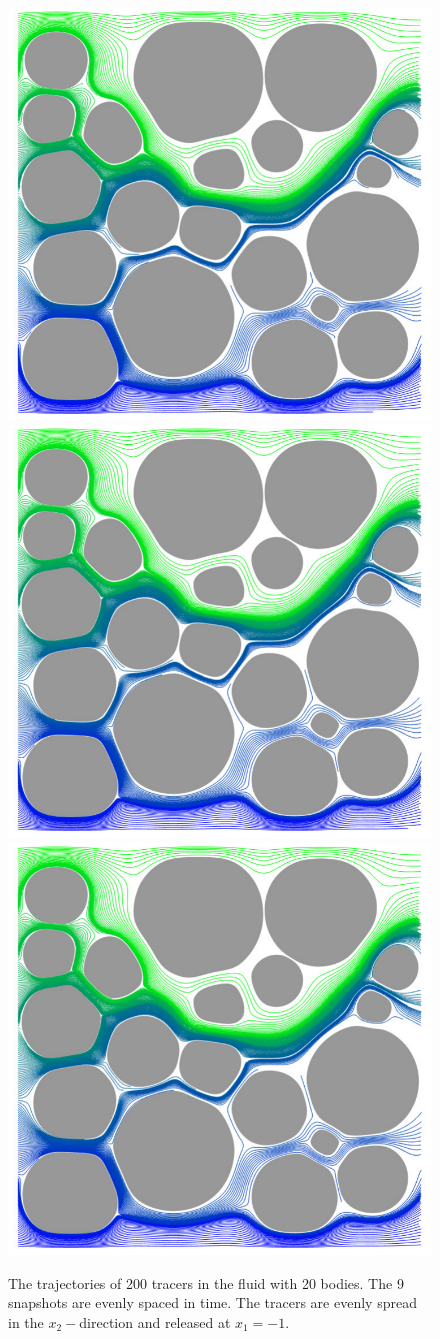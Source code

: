 \documentclass[preprint, 10pt]{elsarticle}
\begin{document}
\begin{figure}[H]
\begin{center}
\includegraphics[width = 0.3 \textwidth]{./figs/tracer_20b210}
\includegraphics[width = 0.3 \textwidth]{./figs/tracer_20b240}
\includegraphics[width = 0.3 \textwidth]{./figs/tracer_20b270}
\caption{\label{fig:Eroding20tracer}The trajectories of 200 tracers in the fluid with 20 bodies. The 9 snapshots are evenly spaced in time. The tracers are evenly spread in the $x_2-$direction and released at $x_1=-1$.}
\end{center}
\end{figure}
\end{document}
